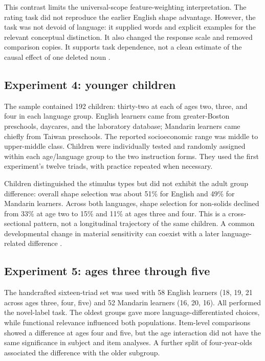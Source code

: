 This contrast limits the universal-scope feature-weighting interpretation.
The rating task did not reproduce the earlier English shape advantage.
However, the task was not devoid of language: it supplied words and explicit
examples for the relevant conceptual distinction. It also changed the
response scale and removed comparison copies. It supports task dependence,
not a clean estimate of the causal effect of one deleted noun
\cite[pp.~501--505,517--518,Appendix~B]{LiDunhamCarey2009SubstanceLC}.

\subsection{Experiment 4: younger children}

The sample contained 192 children: thirty-two at each of ages two, three,
and four in each language group. English learners came from greater-Boston
preschools, daycares, and the laboratory database; Mandarin learners came
chiefly from Taiwan preschools. The reported socioeconomic range was middle
to upper-middle class. Children were individually tested and randomly
assigned within each age/language group to the two instruction forms.
They used the first experiment's twelve triads, with practice repeated
when necessary.

Children distinguished the stimulus types but did not exhibit the adult
group difference: overall shape selection was about 51\% for English
and 49\% for Mandarin learners. Across both languages, shape selection
for non-solids declined from 33\% at age two to 15\% and 11\% at
ages three and four. This is a cross-sectional pattern, not a longitudinal
trajectory of the same children. A common developmental change in
material sensitivity can coexist with a later language-related difference
\cite[pp.~505--509,Fig.~6]{LiDunhamCarey2009SubstanceLC}.

\subsection{Experiment 5: ages three through five}

The handcrafted sixteen-triad set was used with 58 English learners
(18, 19, 21 across ages three, four, five) and 52 Mandarin learners
(16, 20, 16). All performed the novel-label task. The oldest groups gave
more language-differentiated choices, while functional relevance influenced
both populations. Item-level comparisons showed a difference at ages four
and five, but the age interaction did not have the same significance in
subject and item analyses. A further split of four-year-olds associated
the difference with the older subgroup.


